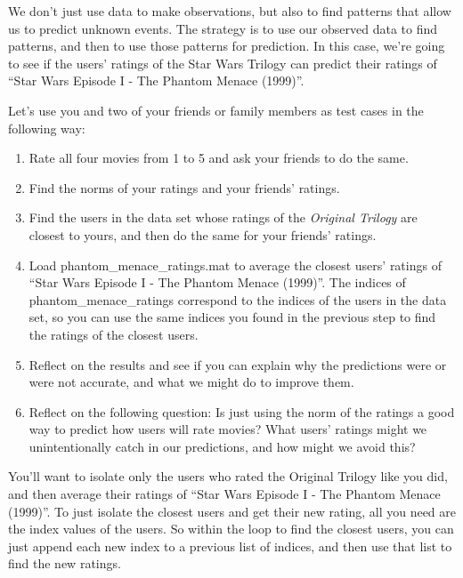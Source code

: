 \documentclass{ximera}
\begin{document}
    \begin{exploration}

    We don't just use data to make observations, but also to find patterns that allow us to predict unknown events. The strategy is to use our observed data to find patterns, and then to use those patterns for prediction. In this case, we're going to see if the users' ratings of the Star Wars Trilogy can predict their ratings of ``Star Wars Episode I - The Phantom Menace (1999)''. 

    \begin{problem}
    
      Let's use you and two of your friends or family members as test cases in the following way: 
    
    \begin{enumerate}
    
      \item  Rate all four movies from 1 to 5 and ask your friends to do the same. 
      \item Find the norms of your ratings and your friends' ratings.
      \item Find the users in the data set whose ratings of the \emph{Original Trilogy} are closest to yours, and then do the same for your friends' ratings.
      \item Load phantom\_menace\_ratings.mat to average the closest users' ratings of ``Star Wars Episode I - The Phantom Menace (1999)''. The indices of phantom\_menace\_ratings correspond to the indices of the users in the data set, so you can use the same indices you found in the previous step to find the ratings of the closest users.
      \item Reflect on the results and see if you can explain why the predictions were or were not accurate, and what we might do to improve them.
      \item Reflect on the following question: Is just using the norm of the ratings a good way to predict how users will rate movies? What users' ratings might we unintentionally catch in our predictions, and how might we avoid this?
    \end{enumerate}

    \begin{hint}

      You'll want to isolate only the users who rated the Original Trilogy like you did, and then average their ratings of ``Star Wars Episode I - The Phantom Menace (1999)''. To just isolate the closest users and get their new rating, all you need are the index values of the users. So within the loop to find the closest users, you can just append each new index to a previous list of indices, and then use that list to find the new ratings.


\end{hint}
\end{problem}
\end{exploration}
\end{document}
